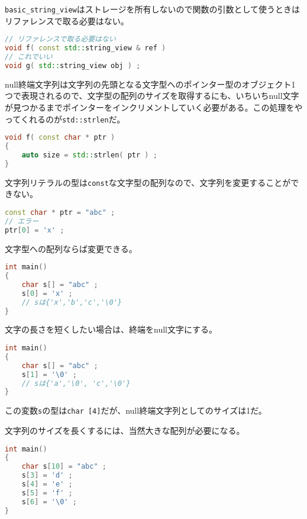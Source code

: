 \texttt{basic\_string\_view}はストレージを所有しないので関数の引数として使うときはリファレンスで取る必要はない。

\begin{lstlisting}[language={C++}]
// リファレンスで取る必要はない
void f( const std::string_view & ref ) 
// これでいい
void g( std::string_view obj ) ;
\end{lstlisting}



null終端文字列は文字列の先頭となる文字型へのポインター型のオブジェクト1つで表現されるので、文字型の配列のサイズを取得するにも、いちいちnull文字が見つかるまでポインターをインクリメントしていく必要がある。この処理をやってくれるのが\texttt{std::strlen}だ。

\begin{lstlisting}[language={C++}]
void f( const char * ptr )
{
    auto size = std::strlen( ptr ) ;
}
\end{lstlisting}

文字列リテラルの型は\texttt{const}な文字型の配列なので、文字列を変更することができない。

\begin{lstlisting}[language={C++}]
const char * ptr = "abc" ;
// エラー
ptr[0] = 'x' ;
\end{lstlisting}

\ifTombow\pagebreak\fi
文字型への配列ならば変更できる。

\begin{lstlisting}[language={C++}]
int main()
{
    char s[] = "abc" ;
    s[0] = 'x' ;
    // sは{'x','b','c','\0'}
}
\end{lstlisting}

文字の長さを短くしたい場合は、終端をnull文字にする。

\begin{lstlisting}[language={C++}]
int main()
{
    char s[] = "abc" ;
    s[1] = '\0' ;
    // sは{'a','\0', 'c','\0'}
}
\end{lstlisting}

この変数\texttt{s}の型は\texttt{char [4]}だが、null終端文字列としてのサイズは1だ。

文字列のサイズを長くするには、当然大きな配列が必要になる。

\begin{lstlisting}[language={C++}]
int main()
{
    char s[10] = "abc" ;
    s[3] = 'd' ;
    s[4] = 'e' ;
    s[5] = 'f' ;
    s[6] = '\0' ;
}
\end{lstlisting}

